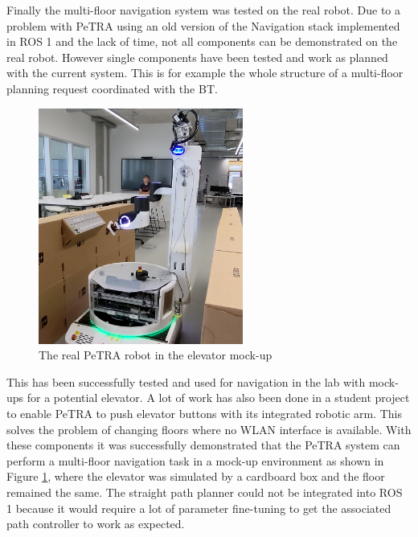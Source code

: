 Finally the multi-floor navigation system was tested on the real robot. Due to a problem with PeTRA using an old version of the Navigation stack implemented in ROS 1 and the lack of time, not all components can be demonstrated on the real robot. However single components have been tested and work as planned with the current system. This is for example the whole structure of a multi-floor planning request coordinated with the BT.
\begin{figure}[H]
    \centering\captionsetup{justification=centering}
    \includegraphics[width=0.6\textwidth]{figures/60_results/petra_elevator.png}
    \caption[The real PeTRA robot in the elevator mock-up]{The real PeTRA robot in the elevator mock-up}
    \label{fig:petra_elevator}
\end{figure}
\noindent
This has been successfully tested and used for navigation in the lab with mock-ups for a potential elevator. A lot of work has also been done in a student project to enable PeTRA to push elevator buttons with its integrated robotic arm. This solves the problem of changing floors where no WLAN interface is available. With these components it was successfully demonstrated that the PeTRA system can perform a multi-floor navigation task in a mock-up environment as shown in Figure \ref{fig:petra_elevator}, where the elevator was simulated by a cardboard box and the floor remained the same. The straight path planner could not be integrated into ROS 1 because it would require a lot of parameter fine-tuning to get the associated path controller to work as expected.
